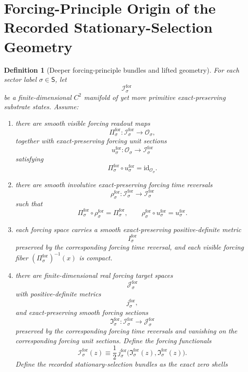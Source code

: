 \documentclass[11pt]{article}
\newcommand{\SectorSet}{\mathsf S}
\newcommand{\ObjClass}[1]{\mathcal O_{#1}}
\newcommand{\ForSpace}[1]{\mathcal I_{#1}^{\mathrm{for}}}
\newcommand{\ForRead}[1]{\Pi_{#1}^{\mathrm{for}}}
\newcommand{\ForUnit}[1]{u_{#1}^{\mathrm{for}}}
\newcommand{\ForTimeRev}[1]{\rho_{#1}^{\mathrm{for}}}
\newcommand{\ForMetric}[1]{I_{#1}^{\mathrm{for}}}
\newcommand{\ForTarget}[1]{\mathcal J_{#1}^{\mathrm{for}}}
\newcommand{\ForTargetMetric}[1]{j_{#1}^{\mathrm{for}}}
\newcommand{\ForSection}[1]{\mathfrak I_{#1}^{\mathrm{for}}}
\newcommand{\ForFunctional}[1]{\mathscr I_{#1}^{\mathrm{for}}}
\newtheorem{definition}{Definition}
\begin{document}
\section{Forcing-Principle Origin of the Recorded Stationary-Selection Geometry}

\begin{definition}[Deeper forcing-principle bundles and lifted geometry]
\label{def:forcing_geometry}
For each sector label \(\sigma\in\SectorSet\), let
\[
\ForSpace{\sigma}
\]
be a finite-dimensional \(C^2\) manifold of yet more primitive exact-preserving substrate states. Assume:
\begin{enumerate}
    \item there are smooth visible forcing readout maps
    \[
    \ForRead{\sigma}:\ForSpace{\sigma}\to\ObjClass{\sigma},
    \]
    together with exact-preserving forcing unit sections
    \[
    \ForUnit{\sigma}:\ObjClass{\sigma}\to\ForSpace{\sigma}
    \]
    satisfying
    \[
    \ForRead{\sigma}\circ\ForUnit{\sigma}=\mathrm{id}_{\ObjClass{\sigma}}.
    \]
    \item there are smooth involutive exact-preserving forcing time reversals
    \[
    \ForTimeRev{\sigma}:\ForSpace{\sigma}\to\ForSpace{\sigma}
    \]
    such that
    \[
    \ForRead{\sigma}\circ\ForTimeRev{\sigma}=\ForRead{\sigma},
    \qquad
    \ForTimeRev{\sigma}\circ\ForUnit{\sigma}=\ForUnit{\sigma}.
    \]
    \item each forcing space carries a smooth exact-preserving positive-definite metric
    \[
    \ForMetric{\sigma}
    \]
    preserved by the corresponding forcing time reversal, and each visible forcing fiber \((\ForRead{\sigma})^{-1}(x)\) is compact.
    \item there are finite-dimensional real forcing target spaces
    \[
    \ForTarget{\sigma}
    \]
    with positive-definite metrics
    \[
    \ForTargetMetric{\sigma},
    \]
    and exact-preserving smooth forcing sections
    \[
    \ForSection{\sigma}:\ForSpace{\sigma}\to\ForTarget{\sigma}
    \]
    preserved by the corresponding forcing time reversals and vanishing on the corresponding forcing unit sections. Define the forcing functionals
    \begin{equation}
    \ForFunctional{\sigma}(z)\equiv \frac12\,
    \ForTargetMetric{\sigma}\bigl(\ForSection{\sigma}(z),\ForSection{\sigma}(z)\bigr).
    \label{eq:forcing_functional}
    \end{equation}
    Define the recorded stationary-selection bundles as the exact zero shells
    \begin{equation}

\end{equation}
\end{enumerate}
\end{definition}
\end{document}
